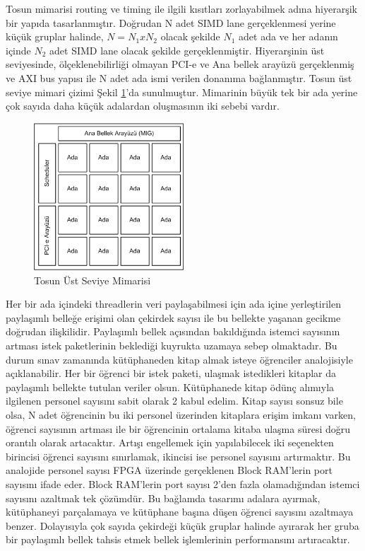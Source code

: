Tosun mimarisi routing ve timing ile ilgili kısıtları zorlayabilmek adına hiyerarşik bir yapıda tasarlanmıştır. Doğrudan N adet SIMD lane gerçeklenmesi yerine küçük gruplar halinde, $N=N_{1}xN_{2}$ olacak şekilde $N_{1}$ adet ada ve her adanın içinde $N_{2}$ adet SIMD lane olacak şekilde gerçeklenmiştir. Hiyerarşinin üst seviyesinde, ölçeklenebilirliği olmayan PCI-e ve Ana bellek arayüzü gerçeklenmiş ve AXI bus yapısı ile N adet ada ismi verilen donanıma bağlanmıştır. Tosun üst seviye mimari çizimi Şekil \ref{image:genelMimari}’da sunulmuştur. Mimarinin büyük tek bir ada yerine çok sayıda daha küçük adalardan oluşmasının iki sebebi  vardır. \par
\begin{figure}[h]
\centering
\shorthandoff{=}
\includegraphics[width=0.5\textwidth]{gorsel/genelMimari.png}
\shorthandoff{=}
\caption{Tosun Üst Seviye Mimarisi}
\label{image:genelMimari}
\end{figure}
Her bir ada içindeki threadlerin veri paylaşabilmesi için ada içine yerleştirilen paylaşımlı belleğe erişimi olan çekirdek sayısı ile bu bellekte yaşanan gecikme doğrudan ilişkilidir. Paylaşımlı bellek açısından bakıldığında istemci sayısının artması istek paketlerinin beklediği kuyrukta uzamaya sebep olmaktadır. Bu durum sınav zamanında kütüphaneden kitap almak isteye öğrenciler analojisiyle açıklanabilir. Her bir öğrenci bir istek paketi, ulaşmak istedikleri kitaplar da paylaşımlı bellekte tutulan veriler olsun. Kütüphanede kitap ödünç alımıyla ilgilenen personel sayısını sabit olarak 2 kabul edelim. Kitap sayısı sonsuz bile olsa, N adet öğrencinin bu iki personel üzerinden kitaplara erişim imkanı varken, öğrenci sayısının artması ile bir öğrencinin ortalama kitaba ulaşma süresi doğru orantılı olarak artacaktır. Artışı engellemek için yapılabilecek iki seçenekten birincisi öğrenci sayısını sınırlamak, ikincisi ise personel sayısını artırmaktır. Bu analojide personel sayısı FPGA üzerinde gerçeklenen Block RAM'lerin port sayısını ifade eder. Block RAM'lerin port sayısı 2'den fazla olamadığından istemci sayısını azaltmak tek çözümdür. Bu bağlamda tasarımı adalara ayırmak, kütüphaneyi parçalamaya ve kütüphane başına düşen öğrenci sayısını azaltmaya benzer. Dolayısıyla çok sayıda çekirdeği küçük gruplar halinde ayırarak her gruba bir paylaşımlı bellek tahsis etmek bellek işlemlerinin performansını artıracaktır. \par
